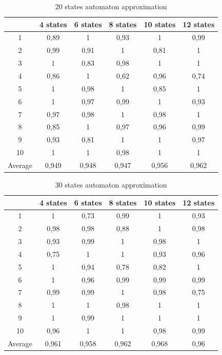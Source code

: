 \documentclass[runningheads,a4paper]{llncs}
\begin{document}
\begin{table}[]
\centering
\caption{20 states automaton approximation}
\label{my-label}
\begin{tabular}{@{}cccccc@{}}
\toprule
        & 4 states & 6 states & 8 states & 10 states & 12 states    \\ \midrule
1       & 0,89     & 1        & 0,93     & 1         & 0,99 \\
2       & 0,99     & 0,91     & 1        & 0,81      & 1 \\
3       & 1        & 0,83     & 0,98     & 1         & 1 \\
4       & 0,86     & 1        & 0,62     & 0,96      & 0,74   \\
5       & 1        & 0,98     & 1        & 0,85      & 1   \\
6       & 1        & 0,97     & 0,99     & 1         & 0,93    \\
7       & 0,97     & 0,98     & 1        & 0,98      & 1    \\
8       & 0,85     & 1        & 0,97     & 0,96      & 0,99     \\
9       & 0,93     & 0,81     & 1        & 1         & 0,97 \\
10      & 1        & 1        & 0,98     & 1         & 1  \\
Average & 0,949    & 0,948    & 0,947    & 0,956     & 0,962  \\ \bottomrule
\end{tabular}
\end{table}


\begin{table}[]
\centering
\caption{30 states automaton approximation}
\label{my-label}
\begin{tabular}{@{}cccccc@{}}
\toprule
        & 4 states & 6 states & 8 states & 10 states & 12 states    \\ \midrule
1       & 1        & 0,73     & 0,99     & 1         & 0,93 \\
2       & 0,98     & 0,98     & 0,88     & 1         & 0,98 \\
3       & 0,93     & 0,99     & 1        & 0,98      & 1 \\
4       & 0,75     & 1        & 1        & 0,93      & 0,96   \\
5       & 1        & 0,94     & 0,78     & 0,82      & 1   \\
6       & 1        & 0,96     & 0,99     & 0,99      & 0,99    \\
7       & 0,99     & 0,99     & 1        & 0,98      & 0,75    \\
8       & 1        & 1        & 0,98     & 1         & 1    \\
9       & 1        & 0,99     & 1        & 1         & 1 \\
10      & 0,96     & 1        & 1        & 0,98      & 0,99  \\
Average & 0,961    & 0,958    & 0,962    & 0,968     & 0,96  \\ \bottomrule
\end{tabular}
\end{table}
\end{document}
